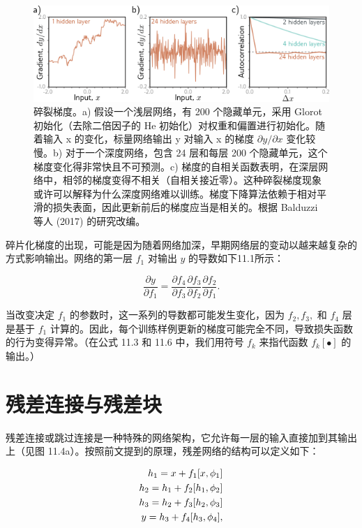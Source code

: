 \begin{figure}[ht!]
\centering
\includegraphics[width=0.7\linewidth]{png/chapter11/ResidualBalduzzi.png}
\caption{碎裂梯度。a) 假设一个浅层网络，有 200 个隐藏单元，采用 Glorot 初始化（去除二倍因子的 He 初始化）对权重和偏置进行初始化。随着输入 x 的变化，标量网络输出 y 对输入 x 的梯度 \(\partial y/\partial x\) 变化较慢。b) 对于一个深度网络，包含 24 层和每层 200 个隐藏单元，这个梯度变化得非常快且不可预测。c) 梯度的自相关函数表明，在深层网络中，相邻的梯度变得不相关（自相关接近零）。这种碎裂梯度现象或许可以解释为什么深度网络难以训练。梯度下降算法依赖于相对平滑的损失表面，因此更新前后的梯度应当是相关的。根据 Balduzzi 等人 (2017) 的研究改编。}
\end{figure}


碎片化梯度的出现，可能是因为随着网络加深，早期网络层的变动以越来越复杂的方式影响输出。网络的第一层 \(f_1\) 对输出 \(y\) 的导数如下11.1所示：

\begin{equation}
\frac{\partial y}{\partial f_1} = \frac{\partial f_4}{\partial f_3} \frac{\partial f_3}{\partial f_2} \frac{\partial f_2}{\partial f_1}. 
\end{equation}

当改变决定 \(f_1\) 的参数时，这一系列的导数都可能发生变化，因为 \(f_2, f_3,\) 和 \(f_4\) 层是基于 \(f_1\) 计算的。因此，每个训练样例更新的梯度可能完全不同，导致损失函数的行为变得异常。（在公式 11.3 和 11.6 中，我们用符号 \(f_k\) 来指代函数 \(f_k[•]\) 的输出。）


\section{残差连接与残差块}
残差连接或跳过连接是一种特殊的网络架构，它允许每一层的输入直接加到其输出上（见图 11.4a）。按照前文提到的原理，残差网络的结构可以定义如下：


\begin{align}
h_1 = x + f_1[x, \phi_1] \notag \\
h_2 = h_1 + f_2[h_1, \phi_2] \notag \\
h_3 = h_2 + f_3[h_2, \phi_3] \notag \\
y = h_3 + f_4[h_3, \phi_4], 
\end{align} 


